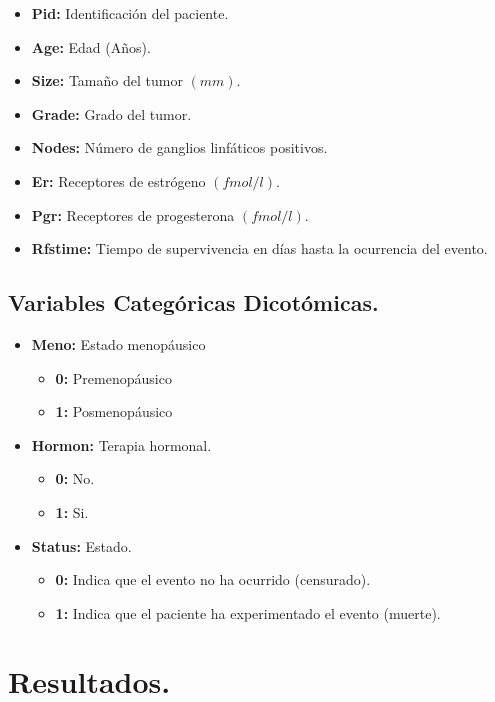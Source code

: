 \documentclass[10pt,a4paper]{article}
\begin{document}
\begin{itemize} 
\item  \textbf{Pid:} Identificación del paciente.
\item \textbf{Age:}  Edad (Años).
\item  \textbf{Size:} Tamaño del tumor $(mm).$
\item \textbf{Grade:} Grado del tumor.
\item  \textbf{Nodes:} Número de ganglios linfáticos positivos.
\item \textbf{Er:} Receptores de estrógeno $(fmol/l)$.
\item  \textbf{Pgr:} Receptores de progesterona $(fmol/l)$.
\item \textbf{Rfstime:} Tiempo de supervivencia en días hasta la ocurrencia del evento.  
\end{itemize}

\subsection{Variables Categóricas Dicotómicas.}
\begin{itemize}

\item \textbf{Meno:} Estado menopáusico 
\begin{itemize}
\item \textbf{0:} Premenopáusico
\item \textbf{1:} Posmenopáusico
\end{itemize}
\item \textbf{Hormon:} Terapia hormonal.
\begin{itemize}
\item \textbf{0:} No.
\item \textbf{1:} Si.
\end{itemize}
\item \textbf{Status:} Estado.
\begin{itemize}
\item \textbf{0:} Indica que el evento no ha ocurrido (censurado).
\item \textbf{1:} Indica que el paciente ha experimentado el evento (muerte).
\end{itemize}
\end{itemize}

\newpage
\section{Resultados.}
\end{document}
